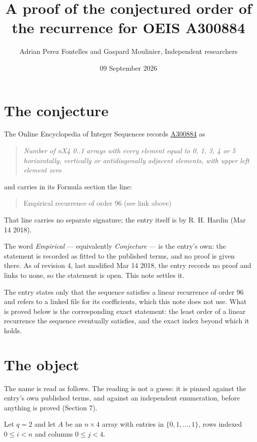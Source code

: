 \documentclass[11pt]{article}
\title{A proof of the conjectured order of the recurrence for OEIS A300884}
\author{Adrian Perez Fontelles and Gaspard Moulinier, Independent researchers}
\date{09 September 2026}
\theoremstyle{definition}
\begin{document}
\maketitle
\section{The conjecture}

The Online Encyclopedia of Integer Sequences records \href{https://oeis.org/A300884}{A300884} as

\begin{quote}\itshape Number of nX4 0..1 arrays with every element equal to 0, 1, 3, 4 or 5 horizontally, vertically or antidiagonally adjacent elements, with upper left element zero\end{quote}

and carries in its Formula section the line:

\begin{quote}\ttfamily Empirical recurrence of order 96 (see link above)\end{quote}

That line carries no separate signature; the entry itself is by R. H. Hardin (Mar 14 2018).

The word {\itshape Empirical} --- equivalently {\itshape Conjecture} --- is the entry's own: the statement is recorded as fitted to the published terms, and no proof is given there. As of revision 4, last modified Mar 14 2018, the entry records no proof and links to none, so the statement is open. This note settles it.

The entry states only that the sequence satisfies a linear recurrence of order $96$ and refers to a linked file for its coefficients, which this note does not use. What is proved below is the corresponding exact statement: the least order of a linear recurrence the sequence eventually satisfies, and the exact index beyond which it holds.

\section{The object}

The name is read as follows. The reading is not a guess: it is pinned against the entry's own published terms, and against an independent enumeration, before anything is proved (Section 7).

Let $q = 2$ and let $A$ be an $n \times 4$ array with entries in $\{0,1,\dots,1\}$, rows indexed $0 \le i < n$ and columns $0 \le j < 4$.
\end{document}
